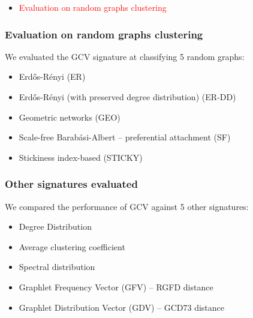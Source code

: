 \documentclass[11pt,xcolor=table]{beamer}
\begin{document}
\begin{frame}
\begin{itemize}
\begin{figure}
  \end{figure}
  \item \textcolor{red}{Evaluation on random graphs clustering} \vfill
 \end{itemize}
 
\end{frame}



\begin{frame}
 \frametitle{Evaluation on random graphs clustering}
 We evaluated the GCV signature at classifying 5 random graphs: \vfill
\begin{itemize}
  \item Erd\H{o}s-R\'{e}nyi (ER) \vfill
  \item Erd\H{o}s-R\'{e}nyi (with preserved degree distribution) (ER-DD) \vfill 
  \item Geometric networks (GEO) \vfill
  \item Scale-free Barab\'{a}si-Albert -- preferential attachment (SF) \vfill
  \item Stickiness index-based (STICKY) \vfill
\end{itemize}


\end{frame}

\begin{frame}
 \frametitle{Other signatures evaluated}
 We compared the performance of GCV against 5 other signatures: \vfill
 \begin{itemize}
 \item Degree Distribution \vfill
 \item Average clustering coefficient \vfill
 \item Spectral distribution \vfill
 \item Graphlet Frequency Vector (GFV) -- RGFD distance \vfill
 \item Graphlet Distribution Vector (GDV) -- GCD73 distance \vfill
\end{itemize}

\end{frame}
\end{document}

